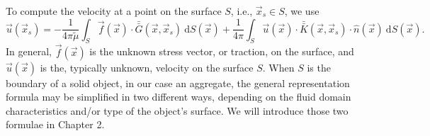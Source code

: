 To compute the velocity at a point on the surface $S$, i.e., $ \vec{x}_s \in S$, we use 
\begin{equation}
   \vec{u}(\vec{x}_s) = - \frac{1}{4 \pi {\tilde{\mu}}} \int_S  \vec{f}(\vec{x}) \cdot \bar{\bar{G}}(\vec{x},\vec{x}_s) \ \text{d}S(\vec{x}) 
+ \frac{1}{4 \pi} 
\int_S
\vec{u}(\vec{x}) \cdot  \bar{\bar{K}}(\vec{x},\vec{x}_s)  
\cdot \hat{n} ( \vec{x})
\ \text{d}S(\vec{x}).
\label{eq_BIE_onS}
\end{equation}
In general, $\vec{f}(\vec{x})$ is the unknown stress vector, or traction, on the surface, and $\vec{u}(\vec{x})$ is the, typically unknown, velocity on the surface $S$. 
When $S$ is the boundary of a solid object, in our case an aggregate, the general representation formula may be simplified in two different ways, depending on the fluid domain characteristics and/or type of the object's surface. We will introduce those two formulae in Chapter 2. 


